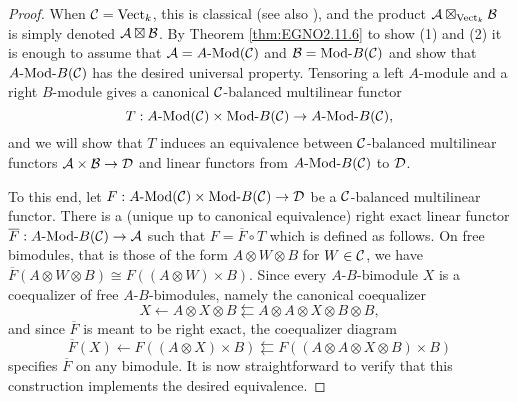 \documentclass[a4paper]{amsart}
\begin{document}
\begin{proof}
	When $\mathcal C = \mathrm{Vect}_k$, this is classical \cite[Prop 5.13]{MR1106898} (see also \cite[Prop 1.46.2]{EGNO}), and the product $\mathcal A \boxtimes_{\mathrm{Vect}_k} \mathcal B$ is simply denoted $\mathcal A \boxtimes \mathcal B$.
	By Theorem \ref{thm:EGNO2.11.6} to show (1) and (2) it is enough to assume that $\cA = \Mod{A}{}(\cC)$ and $\cB = \Mod{}{B}(\cC)$ and show that $\Mod{A }{B}(\cC)$ has the desired universal property. Tensoring a left $A$-module and a right $B$-module gives a canonical $\mathcal C$-balanced multilinear functor 
		\begin{equation*}
			T: \Mod{A}{}(\cC) \times \Mod{}{B}(\cC) \to \Mod{A}{B}(\cC),  
		\end{equation*}
and we will show that $T$ induces an equivalence between $\mathcal C$-balanced multilinear functors $\mathcal A \times \mathcal B \to \mathcal D$ and linear functors from $\Mod{A}{B}(\cC)$ to $\mathcal D$.
	
	To this end, let $F:\Mod{A}{}(\cC) \times \Mod{}{B}(\cC) \to \cD$ be a $\mathcal C$-balanced multilinear functor. 
	There is a (unique up to canonical equivalence) right exact linear functor $\overline F: \Mod{A}{B}(\cC) \to \cA$ such that $F = \overline{F} \circ T$ which is defined as follows. On free bimodules, that is those of the form $A \otimes W \otimes B$ for $W \in \mathcal C$, we have $\overline{F}(A \otimes W \otimes B) \cong F((A \otimes W) \times B)$. Since  every $A$-$B$-bimodule $X$ is a coequalizer of free $A$-$B$-bimodules, namely the canonical coequalizer  
	\begin{equation*}
		X \leftarrow A \otimes X \otimes B \leftleftarrows A \otimes A \otimes X \otimes B \otimes B,
	\end{equation*}
	and since $\overline{F}$ is meant to be right exact, the coequalizer diagram
	\begin{equation*}
		\overline{F}(X) \leftarrow F((A \otimes X) \times B) \leftleftarrows F((A \otimes A \otimes X \otimes B) \times B)
	\end{equation*}
specifies $\overline{F}$ on any bimodule. It is now straightforward to verify that this construction implements the desired equivalence.
%	
\end{proof}
\end{document}
